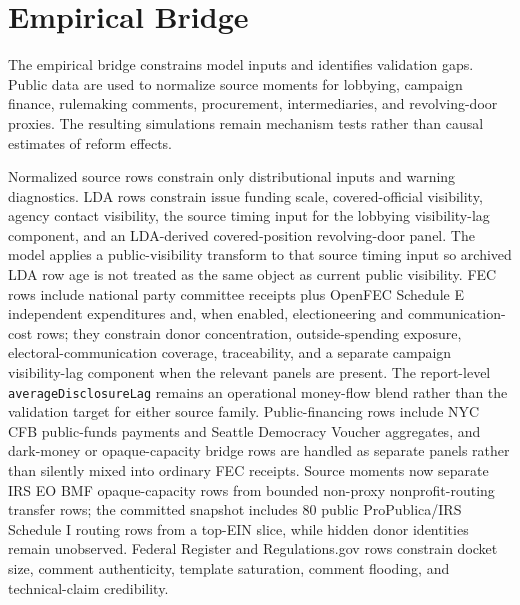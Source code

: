 

\section{Empirical Bridge}

The empirical bridge constrains model inputs and identifies validation gaps. Public data are used to normalize source moments for lobbying, campaign finance, rulemaking comments, procurement, intermediaries, and revolving-door proxies. The resulting simulations remain mechanism tests rather than causal estimates of reform effects.

Normalized source rows constrain only distributional inputs and warning diagnostics. LDA rows constrain issue funding scale, covered-official visibility, agency contact visibility, the source timing input for the lobbying visibility-lag component, and an LDA-derived covered-position revolving-door panel. The model applies a public-visibility transform to that source timing input so archived LDA row age is not treated as the same object as current public visibility. FEC rows include national party committee receipts plus OpenFEC Schedule E independent expenditures and, when enabled, electioneering and communication-cost rows; they constrain donor concentration, outside-spending exposure, electoral-communication coverage, traceability, and a separate campaign visibility-lag component when the relevant panels are present. The report-level \texttt{averageDisclosureLag} remains an operational money-flow blend rather than the validation target for either source family. Public-financing rows include NYC CFB public-funds payments and Seattle Democracy Voucher aggregates, and dark-money or opaque-capacity bridge rows are handled as separate panels rather than silently mixed into ordinary FEC receipts. Source moments now separate IRS EO BMF opaque-capacity rows from bounded non-proxy nonprofit-routing transfer rows; the committed snapshot includes 80 public ProPublica/IRS Schedule I routing rows from a top-EIN slice, while hidden donor identities remain unobserved. Federal Register and Regulations.gov rows constrain docket size, comment authenticity, template saturation, comment flooding, and technical-claim credibility.

